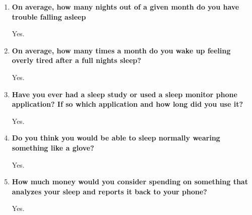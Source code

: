 \documentclass[finalProposal.tex]{subfiles}
\begin{document}
\bigskip

\begin{enumerate}
    \item {\bf{On average, how many nights out of a given month do you have trouble falling asleep}}

\smallskip
Yes.
\smallskip
    \item {\bf{On average, how many times a month do you wake up feeling overly tired after a full nights sleep?}}

\smallskip
Yes.
\smallskip
    \item {\bf{Have you ever had a sleep study or used a sleep monitor phone application? If so which application and how long did you use it?}}

\smallskip
Yes.
\smallskip
    \item {\bf{Do you think you would be able to sleep normally wearing something like a glove?}}

\smallskip
Yes.
\smallskip
    \item {\bf{How much money would you consider spending on something that analyzes your sleep and reports it back to your phone?}}

\smallskip
Yes.
\smallskip
\end{enumerate}
\end{document}
